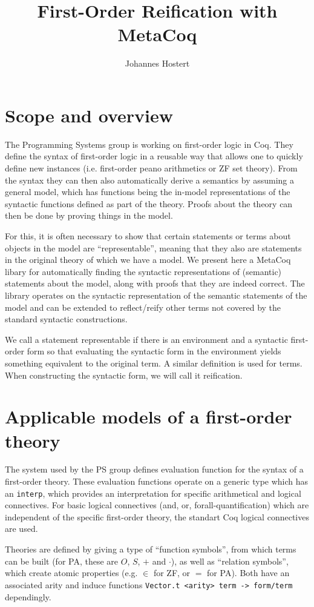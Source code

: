 \documentclass[11pt,a4paper]{article}
\author{Johannes Hostert}
\title{First-Order Reification with MetaCoq}
\begin{document}
	\maketitle
	\tableofcontents
	\newpage
\section{Scope and overview}
The Programming Systems group is working on first-order logic in Coq. They define the syntax of first-order logic in a reusable way that allows one to quickly define new instances (i.e. first-order peano arithmetics or ZF set theory). From the syntax they can then also automatically derive a semantics by assuming a general model, which has functions being the in-model representations of the syntactic functions defined as part of the theory. Proofs about the theory can then be done by proving things in the model.

For this, it is often necessary to show that certain statements or terms about objects in the model are \enquote{representable}, meaning that they also are statements in the original theory of which we have a model. We present here a MetaCoq libary for automatically finding the syntactic representations of (semantic) statements about the model,  along with proofs that they are indeed correct. The library operates on the syntactic representation of the semantic statements of the model and can be extended to reflect/reify other terms not covered by the standard syntactic constructions.

We call a statement representable if there is an environment and a syntactic first-order form so that evaluating the syntactic form in the environment yields something equivalent to the original term. A similar definition is used for terms. When constructing the syntactic form, we will call it reification.
\section{Applicable models of a first-order theory}
The system used by the PS group defines evaluation function for the syntax of a first-order theory. These evaluation functions operate on a generic type which has an \lstinline|interp|, which provides an interpretation for specific arithmetical and logical connectives. For basic logical connectives (and, or, forall-quantification) which are independent of the specific first-order theory, the standart Coq logical connectives are used.

Theories are defined by giving a type of \enquote{function symbols}, from which terms can be built (for PA, these are $O$, $S$, $+$ and $\cdot$), as well as \enquote{relation symbols}, which create atomic properties (e.g. $\in$ for ZF, or $=$ for PA). Both have an associated arity and induce functions \lstinline|Vector.t <arity> term -> form/term| dependingly.
\end{document}
